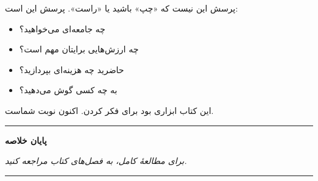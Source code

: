 پرسش این نیست که «چپ» باشید یا «راست». پرسش این است:
\begin{itemize}
    \item چه جامعه‌ای می‌خواهید؟
    \item چه ارزش‌هایی برایتان مهم است؟
    \item حاضرید چه هزینه‌ای بپردازید؟
    \item به چه کسی گوش می‌دهید؟
\end{itemize}

این کتاب ابزاری بود برای فکر کردن. اکنون نوبت شماست.

\vspace{10mm}

\begin{center}
\rule{0.8\textwidth}{2pt}

\vspace{5mm}

{\LARGE\bfseries پایان خلاصه}

\vspace{3mm}

\textit{برای مطالعهٔ کامل، به فصل‌های کتاب مراجعه کنید.}

\vspace{5mm}

\rule{0.8\textwidth}{2pt}
\end{center}